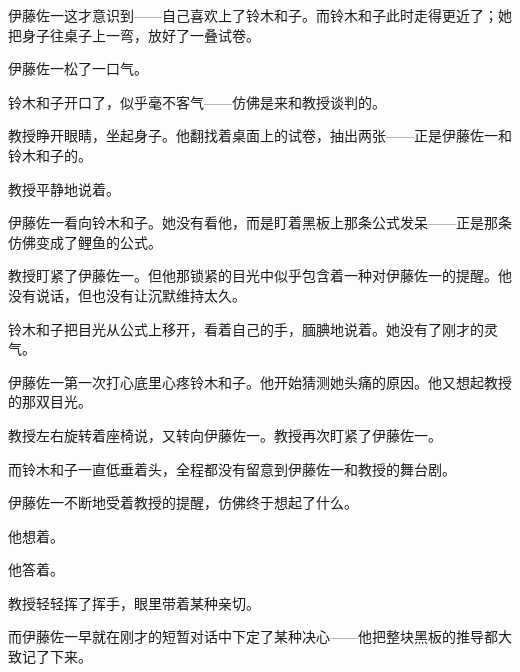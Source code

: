伊藤佐一这才意识到——自己喜欢上了铃木和子。而铃木和子此时走得更近了；她把身子往桌子上一弯，放好了一叠试卷。

伊藤佐一松了一口气。

铃木和子开口了，似乎毫不客气——仿佛是来和教授谈判的。

教授睁开眼睛，坐起身子。他翻找着桌面上的试卷，抽出两张——正是伊藤佐一和铃木和子的。

教授平静地说着。

伊藤佐一看向铃木和子。她没有看他，而是盯着黑板上那条公式发呆——正是那条仿佛变成了鲤鱼的公式。


教授盯紧了伊藤佐一。但他那锁紧的目光中似乎包含着一种对伊藤佐一的提醒。他没有说话，但也没有让沉默维持太久。


铃木和子把目光从公式上移开，看着自己的手，腼腆地说着。她没有了刚才的灵气。

伊藤佐一第一次打心底里心疼铃木和子。他开始猜测她头痛的原因。他又想起教授的那双目光。


教授左右旋转着座椅说，又转向伊藤佐一。教授再次盯紧了伊藤佐一。

而铃木和子一直低垂着头，全程都没有留意到伊藤佐一和教授的舞台剧。

伊藤佐一不断地受着教授的提醒，仿佛终于想起了什么。

他想着。

他答着。

教授轻轻挥了挥手，眼里带着某种亲切。

而伊藤佐一早就在刚才的短暂对话中下定了某种决心——他把整块黑板的推导都大致记了下来。

